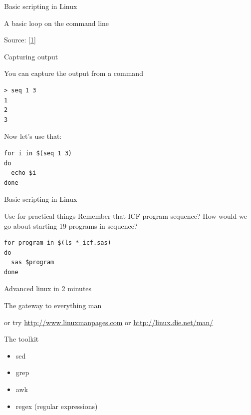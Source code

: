 \documentclass[xcolor=table,compress]{beamer}
\begin{document}
\begin{frame}[fragile]{Basic scripting in Linux}
\begin{block}{A basic loop on the command line}
\lstset{numbers=left, stepnumber=1, frame=single, language=bash}

\end{block}
\tiny{Source: \href{http://www.cyberciti.biz/faq/bash-for-loop/}{[1]}}
\end{frame}

\begin{frame}[fragile]{Capturing output}
\begin{block}{You can capture the output from a command}
\begin{lstlisting}
> seq 1 3
1
2
3
\end{lstlisting}
Now let's use that:
\begin{lstlisting}
for i in $(seq 1 3)
do
  echo $i
done
\end{lstlisting}
\end{block}
\end{frame}


\begin{frame}[fragile]{Basic scripting in Linux}
\begin{block}{Use for practical things}
Remember that ICF program sequence? How would we go about starting 19 programs in sequence?
\begin{lstlisting}
for program in $(ls *_icf.sas)
do
  sas $program
done
\end{lstlisting}
\end{block}
\end{frame}


\begin{frame}{Advanced linux in 2 minutes}
\begin{block}{The gateway to everything}
{man}
\end{block}
or try \href{http://www.linuxmanpages.com}{http://www.linuxmanpages.com} or \href{http://linux.die.net/man/}{http://linux.die.net/man/}
\begin{block}{The toolkit}
\begin{itemize}
\item sed
\item grep
\item awk
\item regex (regular expressions)
\end{itemize}
\end{block}
\end{frame}
\end{document}
